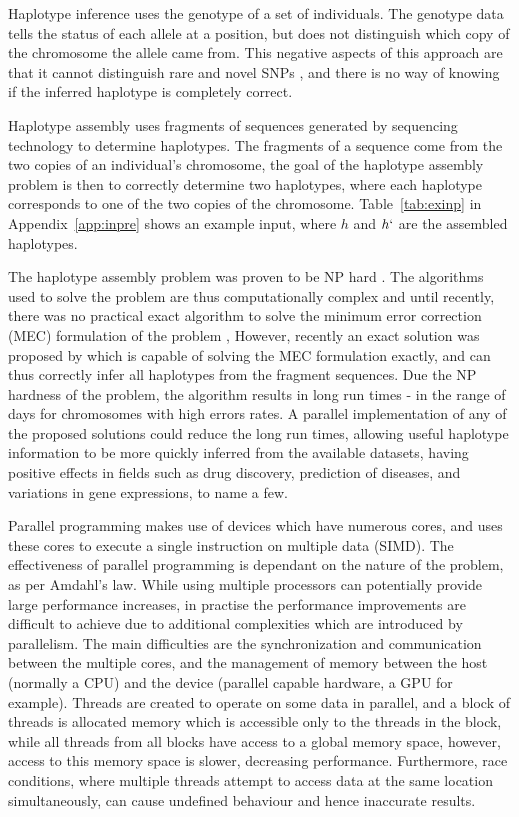 \documentclass[10pt,twocolumn]{article}
\begin{document}
Haplotype inference uses the genotype of a set of individuals. The genotype data tells the status of each
allele at a position, but does not distinguish which copy of the chromosome the allele came from.
This negative aspects of this approach are that it cannot distinguish rare and novel SNPs \cite{he:2010}, 
and there is no way of knowing if the inferred haplotype is completely correct. 

Haplotype assembly uses fragments of sequences generated by sequencing technology to determine
haplotypes. The fragments of a sequence come from the two copies of an individual's chromosome, the goal of the
haplotype assembly problem is then to correctly determine two haplotypes, where each haplotype corresponds to
one of the two copies of the chromosome. Table~\ref{tab:exinp} in Appendix~\ref{app:inpre} shows an example
input, where $h$ and $h`$ are the assembled haplotypes. 

The haplotype assembly problem was proven to be NP hard \cite{lippert:2002}. The algorithms used to solve the
problem are thus computationally complex and until recently, there was no practical exact algorithm to solve 
the minimum error correction (MEC) formulation of the problem \cite{bonizzoni:2003},
However, recently an exact solution was proposed by \cite{chen:2013} which is capable of solving the MEC 
formulation exactly, and can thus correctly infer all haplotypes from the fragment sequences. Due the NP hardness 
of the problem, the algorithm results in long run times - in the range of days for chromosomes with high
errors rates. A parallel implementation of any of the proposed solutions could reduce the long run
times, allowing useful haplotype information to be more quickly inferred from the available datasets, having
positive effects in fields such as drug discovery, prediction of diseases, and variations in gene
expressions, to name a few. 

Parallel programming makes use of devices which have numerous cores, and uses these cores to execute a single
instruction on multiple data (SIMD). The effectiveness of parallel programming is dependant on the nature of 
the problem, as per Amdahl's law. While using multiple processors can potentially provide large performance 
increases, in practise the performance improvements are difficult to achieve due to additional complexities 
which are introduced by parallelism. The main difficulties are the synchronization and communication between 
the multiple cores, and the management of memory between the host (normally a CPU) and the device (parallel
capable hardware, a GPU for example). Threads are created to operate on some data in parallel, and a block of
threads is allocated memory which is accessible only to the threads in the block, while all threads from all
blocks have access  to a global memory space, however, access to this  memory space is slower, decreasing 
performance. Furthermore, race conditions, where multiple threads attempt to access data at the same location 
simultaneously, can cause undefined behaviour and hence inaccurate results.
\end{document}
